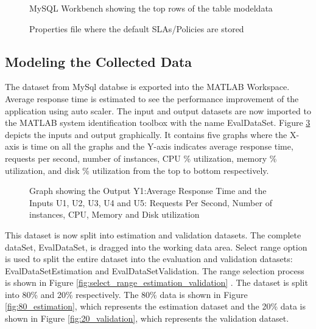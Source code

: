 \documentclass[article,type=msc,colorback,12pt,accentcolor=tud8b,table]{tudthesis}
\begin{document}
		  	  \begin{figure}[h]
		  	  	\begin{center}
		  	  		\makebox[\textwidth]{\texttt{[image: E6]}}
		  	  	\end{center}
		  	  	\caption{MySQL Workbench showing the top rows of the table modeldata}
		  	  	\label{fig:db_rows}
		  	  \end{figure}
		  	  
 		  	  \begin{figure}[h]
  	  		  	  	\begin{center}
  	  		  	  	\end{center}
  	  		  	  	\caption{Properties file where the default SLAs/Policies are stored}
  	  		  	  	\label{fig:autoscaler_sla_policies}
 		  	  \end{figure}
		  	  
		  	  
	
	\subsection{Modeling the Collected Data}
	
	The dataset from MySql databse is exported into the MATLAB Workspace. Average response time is estimated to see the performance improvement of the application using auto scaler. The input and output datasets are now imported to the MATLAB system identification toolbox with the name EvalDataSet. Figure \ref{fig:output_responsetime_input_5} depicts the inputs and output graphically. It contains five graphs where the X-axis is time on all the graphs and the Y-axis indicates average response time, requests per second, number of instances, CPU \% utilization, memory \% utilization, and disk \% utilization from the top to bottom respectively.
	
\begin{figure}
	\begin{center}
	\end{center}
	\caption{Graph showing the Output Y1:Average Response Time and the Inputs U1, U2, U3, U4 and U5: Requests Per Second, Number of instances, CPU, Memory and Disk utilization }
	\label{fig:output_responsetime_input_5}
\end{figure}
This dataset is now split into estimation and validation datasets. The complete dataSet, EvalDataSet, is dragged into the working data area. Select range option is used to split the entire dataset into the evaluation and validation datasets: EvalDataSetEstimation and EvalDataSetValidation. The range selection process is shown in Figure \ref{fig:select_range_estimation_validation} . The dataset is split into 80\% and 20\% respectively. The 80\% data is shown in Figure \ref{fig:80_estimation}, which represents the estimation dataset and the 20\% data is shown in Figure \ref{fig:20_validation}, which represents the validation dataset. 
\end{document}
